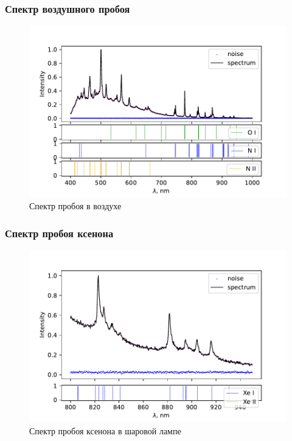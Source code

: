 \documentclass{beamer}
\begin{document}
	\begin{frame}
		\frametitle{Спектр воздушного пробоя}
		\begin{figure}
			\centering
			\includegraphics[width=\linewidth]{gen/air_lines.pdf}
			\caption*{Спектр пробоя в воздухе}
		\end{figure}
	\end{frame}

	\begin{frame}
		\frametitle{Спектр пробоя ксенона}
		\begin{figure}
			\centering
			\includegraphics[width=\linewidth]{gen/xe_lines_spherical.pdf}
			\caption*{Спектр пробоя ксенона в шаровой лампе}
		\end{figure}
	\end{frame}
			
\end{document}
